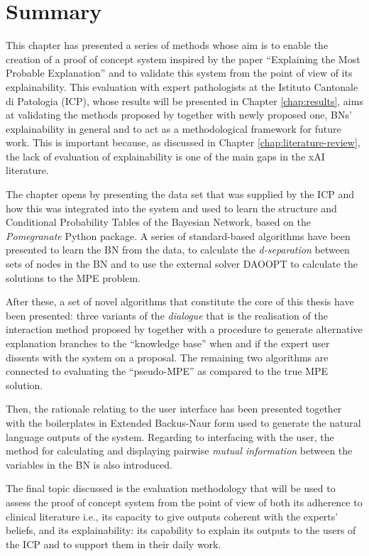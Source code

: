 \section{Summary}
This chapter has presented a series of methods whose aim is to enable the creation of a proof of concept system inspired by the paper \enquote{Explaining the Most Probable Explanation} \citep{Butz2018} and to validate this system from the point of view of its explainability.
This evaluation with expert pathologists at the Istituto Cantonale di Patologia (ICP), whose results will be presented in Chapter \ref{chap:results}, aims at validating the methods proposed by \citet{Butz2018} together with newly proposed one, BNs' explainability in general and to act as a methodological framework for future work.
This is important because, as discussed in Chapter \ref{chap:literature-review}, the lack of evaluation of explainability is one of the main gaps in the xAI literature.

The chapter opens by presenting the data set that was supplied by the ICP and how this was integrated into the system and used to learn the structure and Conditional Probability Tables of the Bayesian Network, based on the \textit{Pomegranate} Python package.
A series of standard-based algorithms have been presented to learn the BN from the data, to calculate the \textit{d-separation} between sets of nodes in the BN and to use the external solver DAOOPT to calculate the solutions to the MPE problem.

After these, a set of novel algorithms that constitute the core of this thesis have been presented: three variants of the \textit{dialogue} that is the realisation of the interaction method proposed by \citet{Butz2018} together with a procedure to generate alternative explanation branches to the \enquote{knowledge base} when and if the expert user dissents with the system on a proposal.
The remaining two algorithms are connected to evaluating the \enquote{pseudo-MPE} as compared to the true MPE solution.

Then, the rationale relating to the user interface has been presented together with the boilerplates in Extended Backus-Naur form used to generate the natural language outputs of the system.
Regarding to interfacing with the user, the method for calculating and displaying pairwise \textit{mutual information} between the variables in the BN is also introduced.

The final topic discussed is the evaluation methodology that will be used to assess the proof of concept system from the point of view of both its adherence to clinical literature i.e., its capacity to give outputs coherent with the experts' beliefs, and its explainability: its capability to explain its outputs to the users of the ICP and to support them in their daily work.

